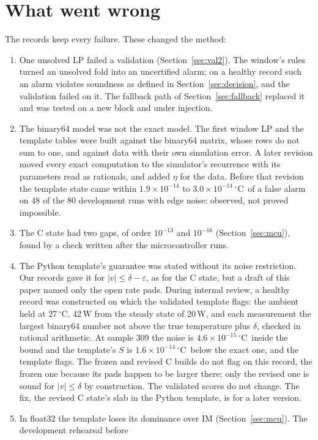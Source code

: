 \documentclass[11pt,a4paper]{article}
\newcommand{\degC}{\ensuremath{{}^\circ}C}
\newcommand{\sci}[2]{\ensuremath{#1\times10^{#2}}}
\begin{document}
\section{What went wrong}\label{sec:wrong}

The records keep every failure. These changed the method:
\begin{enumerate}
\item One unsolved LP failed a validation (Section~\ref{sec:val2}). The window's rules turned an unsolved fold into an
  uncertified alarm; on a healthy record such an alarm violates soundness as defined in Section~\ref{sec:decision},
  and the validation failed on it. The fallback path of Section~\ref{sec:fallback} replaced it and
  was tested on a new block and under injection.
\item The binary64 model was not the exact model. The first window LP and the template tables were built against the
  binary64 matrix, whose rows do not sum to one, and against data with their own simulation error. A later revision
  moved every exact computation to the simulator's recurrence with its parameters read as rationals, and added $\eta$
  for the data. Before that revision the template state came within \sci{1.9}{-14} to \sci{3.0}{-14}\,\degC\ of a
  false alarm on 48 of the 80 development runs with edge noise: observed, not proved impossible.
\item The C state had two gaps, of order $10^{-13}$ and $10^{-16}$ (Section~\ref{sec:mcu}), found by a check written
  after the microcontroller runs.
\item The Python template's guarantee was stated without its noise restriction. Our records gave it for
  $|v|\le\delta-\varepsilon$, as for the C state, but a draft of this paper named only the open rate pads. During
  internal review, a healthy record was constructed on which the validated template flags: the ambient held at 27\,\degC, 42\,W
  from the steady state of 20\,W, and each measurement the largest binary64 number not above the true temperature plus
  $\delta$, checked in rational arithmetic. At sample 309 the noise is \sci{4.6}{-15}\,\degC\ inside the bound and the
  template's $S$ is \sci{1.6}{-14}\,\degC\ below the exact one, and the template flags. The frozen and revised C builds
  do not flag on this record, the frozen one because its pads happen to be larger there; only the revised one is
  sound for $|v|\le\delta$ by construction. The validated scores
  do not change. The fix, the revised C state's slab in the Python template, is for a later version.
\item In float32 the template loses its dominance over IM (Section~\ref{sec:mcu}). The development rehearsal before

\end{enumerate}
\end{document}

